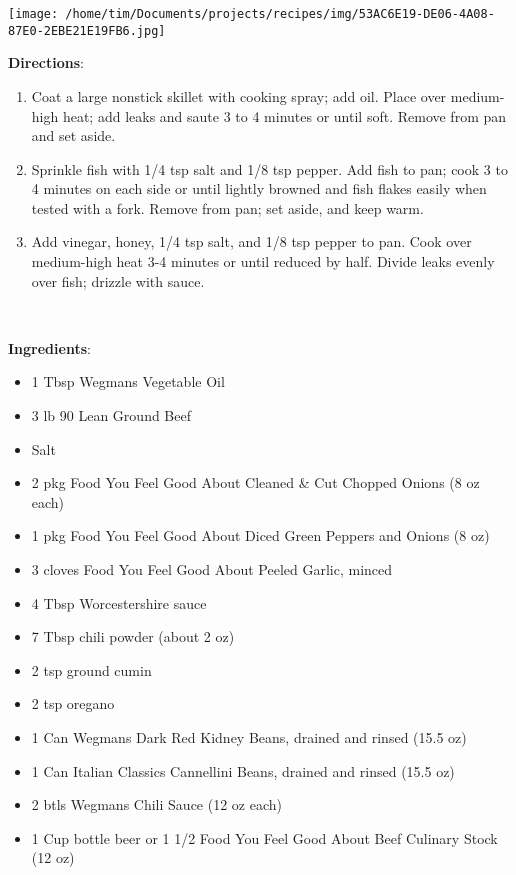 \documentclass[11pt, twoside, openany]{book}
\begin{document}
\begin{minipage}[t]{0.2\linewidth}
\centering \strut\vspace*{-\baselineskip}\newline
\texttt{[image: /home/tim/Documents/projects/recipes/img/53AC6E19-DE06-4A08-87E0-2EBE21E19FB6.jpg]}\\
\end{minipage}\vspace{3mm}
\textbf{Directions}:
\vspace{-3mm}\begin{enumerate}\setlength\itemsep{-1mm}
\item Coat a large nonstick skillet with cooking spray; add oil. Place over medium-high heat; add leaks and saute 3 to 4 minutes or until soft. Remove from pan and set aside.
\item Sprinkle fish with 1/4 tsp salt and 1/8 tsp pepper. Add fish to pan; cook 3 to 4 minutes on each side or until lightly browned and fish flakes easily when tested with a fork. Remove from pan; set aside, and keep warm.
\item Add vinegar, honey, 1/4 tsp salt, and 1/8 tsp pepper to pan. Cook over medium-high heat 3-4 minutes or until reduced by half. Divide leaks evenly over fish; drizzle with sauce. 
\end{enumerate}
 \label{beef-chili}\hfill\textit{}\\
\begin{minipage}[t]{0.8\linewidth}
\textbf{Ingredients}:\vspace{-3mm}
\begin{multicols}{2}
\begin{itemize}\setlength\itemsep{-1mm}
\item 1 Tbsp Wegmans Vegetable Oil
\item 3 lb 90 Lean Ground Beef
\item Salt
\item 2 pkg Food You Feel Good About Cleaned & Cut Chopped Onions (8 oz each)
\item 1 pkg Food You Feel Good About Diced Green Peppers and Onions (8 oz)
\item 3 cloves Food You Feel Good About Peeled Garlic, minced
\item 4 Tbsp Worcestershire sauce
\item 7 Tbsp chili powder (about 2 oz)
\item 2 tsp ground cumin
\item 2 tsp oregano
\item 1 Can Wegmans Dark Red Kidney Beans, drained and rinsed (15.5 oz)
\item 1 Can Italian Classics Cannellini Beans, drained and rinsed (15.5 oz)
\item 2 btls Wegmans Chili Sauce (12 oz each)
\item 1 Cup bottle beer or 1 1/2 Food You Feel Good About Beef Culinary Stock (12 oz)
\end{itemize}
\end{multicols}
\end{minipage}
\end{document}
